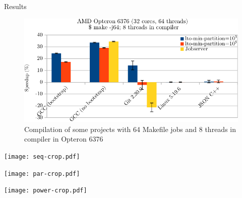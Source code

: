 \begin{subsection}{Results}
\begin{figure}
\centering
	 \includegraphics[scale=1]{figuras/experiment_projects_new-crop.pdf}
	  \caption{Compilation of some projects with 64 Makefile jobs and 8 threads in compiler in Opteron 6376}
	  \label{fig:gcc_projects}
\end{figure}

\begin{landscape}
 \vspace*{-2cm}%
 \noindent%
 \hspace*{-2cm}%
    \texttt{[image: seq-crop.pdf]}
    \label{fig:analysis_classical}
\end{landscape}

\begin{landscape}
 \vspace*{-2cm}%
 \noindent%
 \hspace*{-2cm}%
    \texttt{[image: par-crop.pdf]}
    \label{fig:analysis_classical_parallel}
\end{landscape}

\begin{landscape}
 \vspace*{-2cm}%
 \noindent%
 \hspace*{-2cm}%
    \texttt{[image: power-crop.pdf]}
    \label{fig:power}
\end{landscape}

\end{subsection}

